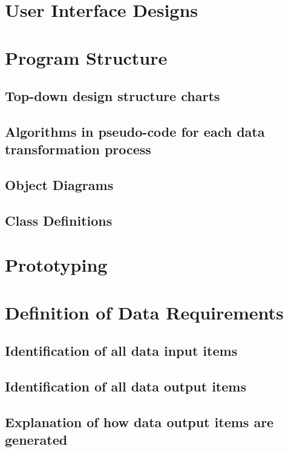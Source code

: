 \begin{itemize}
\section{User Interface Designs}

\section{Program Structure}

\subsection{Top-down design structure charts}

\subsection{Algorithms in pseudo-code for each data transformation process}

\subsection{Object Diagrams}

\subsection{Class Definitions}

\section{Prototyping}

\section{Definition of Data Requirements}

\subsection{Identification of all data input items}

\subsection{Identification of all data output items}

\subsection{Explanation of how data output items are generated}


\end{itemize}
